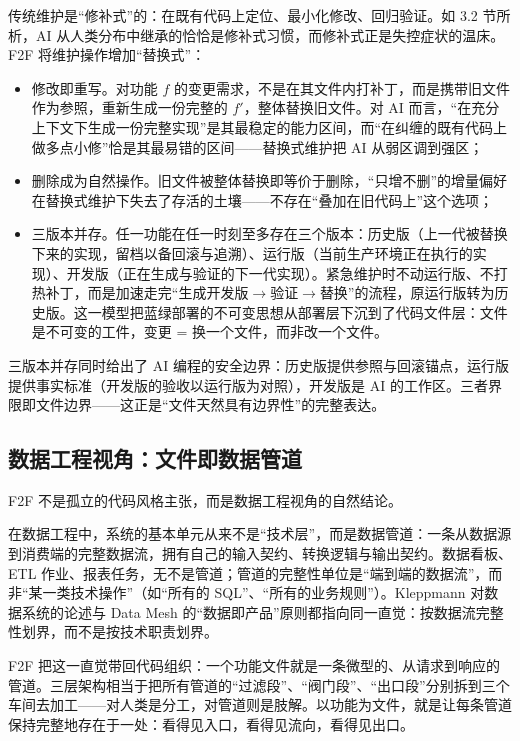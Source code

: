 \documentclass[11pt,a4paper]{ctexart}
\begin{document}
传统维护是“修补式”的：在既有代码上定位、最小化修改、回归验证。如 3.2 节所析，AI 从人类分布中继承的恰恰是修补式习惯，而修补式正是失控症状的温床。F2F 将维护操作增加“替换式”：

\begin{itemize}
\item 修改即重写。对功能 $f$ 的变更需求，不是在其文件内打补丁，而是携带旧文件作为参照，重新生成一份完整的 $f'$，整体替换旧文件。对 AI 而言，“在充分上下文下生成一份完整实现”是其最稳定的能力区间，而“在纠缠的既有代码上做多点小修”恰是其最易错的区间——替换式维护把 AI 从弱区调到强区；
\item 删除成为自然操作。旧文件被整体替换即等价于删除，“只增不删”的增量偏好在替换式维护下失去了存活的土壤——不存在“叠加在旧代码上”这个选项；
\item 三版本并存。任一功能在任一时刻至多存在三个版本：历史版（上一代被替换下来的实现，留档以备回滚与追溯）、运行版（当前生产环境正在执行的实现）、开发版（正在生成与验证的下一代实现）。紧急维护时不动运行版、不打热补丁，而是加速走完“生成开发版$\rightarrow$验证$\rightarrow$替换”的流程，原运行版转为历史版。这一模型把蓝绿部署的不可变思想\cite{ref8,ref9}从部署层下沉到了代码文件层：文件是不可变的工件，变更 = 换一个文件，而非改一个文件。
\end{itemize}

三版本并存同时给出了 AI 编程的安全边界：历史版提供参照与回滚锚点，运行版提供事实标准（开发版的验收以运行版为对照），开发版是 AI 的工作区。三者界限即文件边界——这正是“文件天然具有边界性”的完整表达。

\subsection{数据工程视角：文件即数据管道}
F2F 不是孤立的代码风格主张，而是数据工程视角的自然结论。

在数据工程中，系统的基本单元从来不是“技术层”，而是数据管道：一条从数据源到消费端的完整数据流，拥有自己的输入契约、转换逻辑与输出契约。数据看板、ETL 作业、报表任务，无不是管道；管道的完整性单位是“端到端的数据流”，而非“某一类技术操作”（如“所有的 SQL”、“所有的业务规则”）。Kleppmann 对数据系统的论述\cite{ref12}与 Data Mesh 的“数据即产品”原则\cite{ref13}都指向同一直觉：按数据流完整性划界，而不是按技术职责划界。

F2F 把这一直觉带回代码组织：一个功能文件就是一条微型的、从请求到响应的管道。三层架构相当于把所有管道的“过滤段”、“阀门段”、“出口段”分别拆到三个车间去加工——对人类是分工，对管道则是肢解。以功能为文件，就是让每条管道保持完整地存在于一处：看得见入口，看得见流向，看得见出口。
\end{document}
